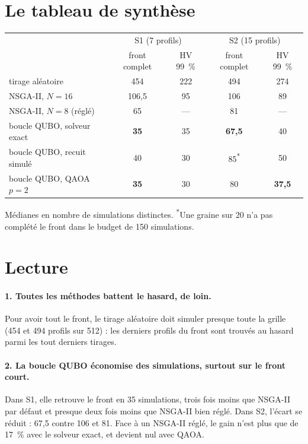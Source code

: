 \section{Le tableau de synthèse}
\begin{center}
\renewcommand{\arraystretch}{1.2}
\begin{tabular}{lcccc}
\toprule
 & \multicolumn{2}{c}{S1 (7 profils)} & \multicolumn{2}{c}{S2 (15 profils)} \\
 & front complet & HV 99~\% & front complet & HV 99~\% \\
\midrule
tirage aléatoire & 454 & 222 & 494 & 274 \\
NSGA-II, $N=16$ & 106,5 & 95 & 106 & 89 \\
NSGA-II, $N=8$ (réglé) & 65 & --- & 81 & --- \\
boucle QUBO, solveur exact & \textbf{35} & 35 & \textbf{67,5} & 40 \\
boucle QUBO, recuit simulé & 40 & 30 & 85\textsuperscript{*} & 50 \\
boucle QUBO, QAOA $p=2$ & \textbf{35} & 30 & 80 & \textbf{37,5} \\
\bottomrule
\end{tabular}

\smallskip
{\footnotesize Médianes en nombre de simulations distinctes. \textsuperscript{*}Une graine sur 20 n'a pas complété le front dans le budget de 150 simulations.}
\end{center}

\section{Lecture}
\paragraph{1. Toutes les méthodes battent le hasard, de loin.} Pour avoir tout le front, le tirage aléatoire doit simuler presque toute la grille (454 et 494 profils sur 512) : les derniers profils du front sont trouvés au hasard parmi les tout derniers tirages.

\paragraph{2. La boucle QUBO économise des simulations, surtout sur le front court.} Dans S1, elle retrouve le front en 35 simulations, trois fois moins que NSGA-II par défaut et presque deux fois moins que NSGA-II bien réglé. Dans S2, l'écart se réduit : 67,5 contre 106 et 81. Face à un NSGA-II réglé, le gain n'est plus que de 17~\% avec le solveur exact, et devient nul avec QAOA.

